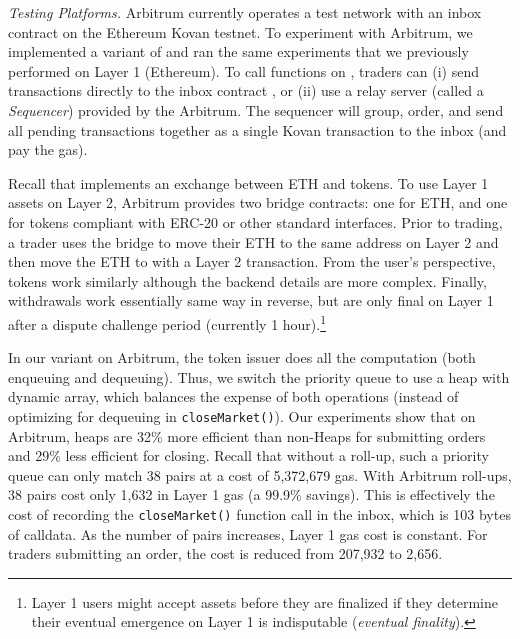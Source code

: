 \textit{Testing Platforms.} Arbitrum currently operates a test network with an inbox contract on the Ethereum Kovan testnet. To experiment with Arbitrum, we implemented a variant of \cm and ran the same experiments that we previously performed on Layer 1 (Ethereum). To call functions on \cm, traders can (i) send transactions directly to the inbox contract \href{https://kovan.etherscan.io/address/0x76bF1345224fE606E2aB38B8E52B83512328A9DF}, or (ii) use a relay server (called a \textit{Sequencer}) provided by the Arbitrum. The sequencer will group, order, and send all pending transactions together as a single Kovan transaction to the inbox (and pay the gas). 

Recall that \cm implements an exchange between ETH and tokens. To use Layer 1 assets on Layer 2, Arbitrum provides two bridge contracts: one for ETH, and one for tokens compliant with ERC-20 or other standard interfaces. Prior to trading, a trader uses the bridge to move their ETH to the same address on Layer 2 and then move the ETH to \cm with a Layer 2 transaction. From the user's perspective, tokens work similarly although the backend details are more complex. Finally, withdrawals work essentially same way in reverse, but are only final on Layer 1 after a dispute challenge period (currently 1 hour).\footnote{Layer 1 users might accept assets before they are finalized if they determine their eventual emergence on Layer 1 is indisputable (\textit{eventual finality}).}  

%

  
In our \cm variant on Arbitrum, the token issuer does all the computation (both enqueuing and dequeuing). Thus, we switch the priority queue to use a heap with dynamic array, which balances the expense of both operations (instead of optimizing for dequeuing in \texttt{closeMarket()}). Our experiments show that on Arbitrum, heaps are 32\% more efficient than non-Heaps for submitting orders and 29\% less efficient for closing. Recall that without a roll-up, such a priority queue can only match 38 pairs at a cost of 5,372,679 gas. With Arbitrum roll-ups, 38 pairs cost only 1,632 in Layer 1 gas (a 99.9\% savings). This is effectively the cost of recording the \texttt{closeMarket()} function call in the inbox, which is 103 bytes of calldata. As the number of pairs increases, Layer 1 gas cost is constant. For traders submitting an order, the cost is reduced from  207,932 to 2,656. 
 

